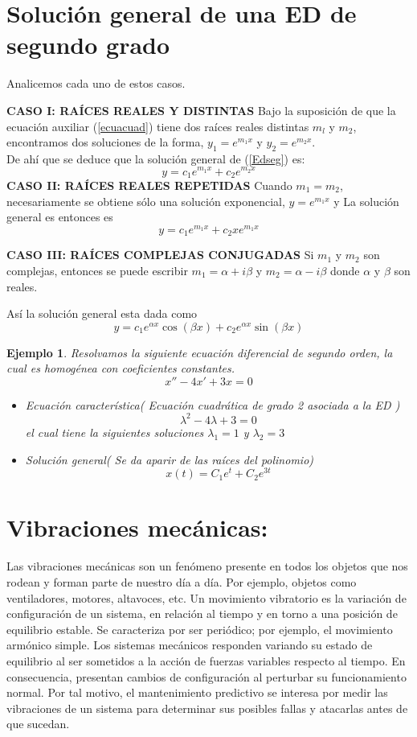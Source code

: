 \documentclass[oneside,12pt]{report}
\newtheorem{ejem}{Ejemplo}[chapter]
\begin{document}
\section{Solución general de una ED de segundo grado}
Analicemos cada uno de estos casos.

\textbf{\textbf{CASO I: RAÍCES REALES Y DISTINTAS}} Bajo la suposición de que la ecuación
auxiliar (\ref{ecuacuad}) tiene dos raíces reales distintas $m_l$ y $m_2$, encontramos dos soluciones de la forma,
$y_1=e^{m_1x}$ y $y_2=e^{m_2x}$. \\
 De ahí que se deduce que la solución
general de (\ref{Edseg}) es:
\begin{equation}
	y=c_1e^{m_1x}+c_2e^{m_2x}
\end{equation}
\textbf{CASO II: RAÍCES REALES REPETIDAS} Cuando $m_1=m_2$, necesariamente se obtiene
sólo una solución exponencial, $y=e^{m_1x}$  y La solución general es entonces es
\begin{equation}
	y=c_1e^{m_1x}+c_2xe^{m_1x}
\end{equation}

\textbf{\textbf{CASO III: RAÍCES COMPLEJAS CONJUGADAS}} Si $m_1$ y $m_2$ son complejas, entonces
se puede escribir $m_1=\alpha+i\beta$ y $m_2=\alpha-i\beta$ donde $\alpha$ y $\beta$	son reales.

Así la solución general esta dada como 
$$y=c_1e^{\alpha x}\cos(\beta x)+c_2e^{\alpha x}\sin(\beta x) $$
\begin{ejem}
	Resolvamos la siguiente ecuación diferencial de segundo orden, la cual es homogénea con coeficientes constantes.
	$$x''-4x'+3x=0$$
	\begin{itemize}
		\item Ecuación característica( Ecuación cuadrática de grado 2 asociada a la ED )
		$$\lambda^2-4\lambda+3=0$$
		el cual tiene la siguientes soluciones $\lambda_1=1$ y $\lambda_2=3$
		\item  Solución general( Se da aparir de las raíces del polinomio)
		$$x(t)=C_1e^{t}+C_2e^{3t}$$
	\end{itemize}
\end{ejem}
	
\section{Vibraciones mecánicas:}	


Las vibraciones mecánicas son un fenómeno presente en todos los objetos que nos rodean y forman parte de nuestro día a día. Por ejemplo, objetos como ventiladores, motores, altavoces, etc.
Un movimiento vibratorio es la variación de configuración de un sistema, en relación al tiempo y en torno a una posición de equilibrio estable. Se caracteriza por ser periódico; por ejemplo, el movimiento armónico simple.
Los sistemas mecánicos responden variando su estado de equilibrio al ser sometidos a la acción de fuerzas variables respecto al tiempo. En consecuencia, presentan cambios de configuración al perturbar su funcionamiento normal. Por tal motivo, el mantenimiento predictivo se interesa por medir las vibraciones de un sistema para determinar sus posibles fallas y atacarlas antes de que sucedan.\\
\end{document}
